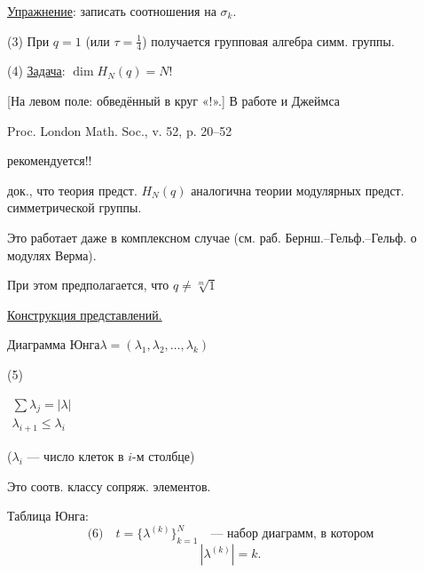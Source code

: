 \underline{Упражнение}: записать соотношения на $\sigma_k$.

(3) При $q=1$ (или $\tau=\frac14$) получается групповая алгебра симм. группы.

(4) \underline{Задача}: $\dim H_N(q)=N!$

[На левом поле: обведённый в круг «!».]
В работе  и Джеймса

Proc. London Math. Soc., v. 52, p. 20--52

рекомендуется!!

док., что теория предст. $H_N(q)$ аналогична теории модулярных
предст. симметрической группы.

Это работает даже в комплексном случае (см. раб. Бернш.--Гельф.--Гельф.
о модулях Верма).

При этом предполагается, что $q\ne\sqrt[m]{1}$

\underline{Конструкция представлений.}

Диаграмма Юнга\quad $\lambda=(\lambda_1,\lambda_2,\ldots,\lambda_k)$

\begin{center}
(5)\qquad
{}
\qquad
$\begin{gathered}\sum\lambda_j=|\lambda|\\[8pt]\lambda_{i+1}\leq\lambda_i\end{gathered}$
\end{center}

($\lambda_i$ --- число клеток в $i$-м столбце)

Это соотв. классу сопряж. элементов.


Таблица Юнга:
\begin{equation*}
\text{(6)}\quad t=\{\lambda^{(k)}\}_{k=1}^{N}
\quad\text{--- набор диаграмм, в котором}
\end{equation*}
\begin{equation*}
|\lambda^{(k)}|=k.
\end{equation*}

